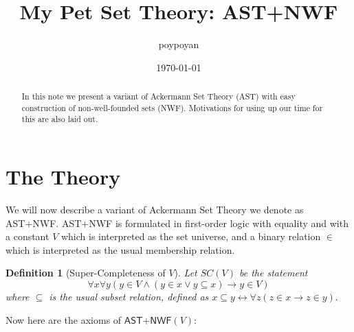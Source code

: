 \documentclass{article}
\title{My Pet Set Theory: \textsf{AST+NWF}}
\author{poypoyan}
\date{\petsa\today}
\newtheorem{definition}{Definition}[section]
\begin{document}
\maketitle

\begin{abstract}
In this note we present a variant of Ackermann Set Theory (AST) with easy construction of non-well-founded sets (NWF). Motivations for using up our time for this are also laid out.
\end{abstract}

\section{The Theory}
We will now describe a variant of Ackermann Set Theory \cite{ackermann} we denote as \textsf{AST+NWF}. \textsf{AST+NWF} is formulated in first-order logic with equality and with a constant $V$ which is interpreted as the set universe, and a binary relation $\in$ which is interpreted as the usual membership relation.

\begin{definition}[Super-Completeness of $V$]
Let $SC(V)$ be the statement $$\forall x \forall y (y \in V \wedge (y \in x \vee y \subseteq x) \rightarrow y \in V)$$ where $\subseteq$ is the usual subset relation, defined as $x \subseteq y \leftrightarrow \forall z(z \in x \rightarrow z \in y).$
\end{definition}

\noindent Now here are the axioms of $\textsf{AST+NWF}(V)$:
\end{document}
